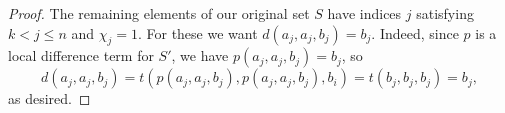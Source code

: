 \begin{proof}
The remaining elements of our original set $S$
have indices $j$ satisfying $k<j\leq n$ and $\chi_j = 1$.
For these we want $d(a_j,a_j,b_j) = b_j$.
Indeed,
since $p$ is a local difference term for $S'$, we have
$p(a_j,a_j,b_j) = b_j$, so
\begin{equation*}
d(a_j,a_j,b_j) =
  t(p(a_j,a_j,b_j), p(a_j,a_j,b_j), b_i)=
  t(b_j, b_j, b_j) =b_j,
\end{equation*}
as desired.
\end{proof}
